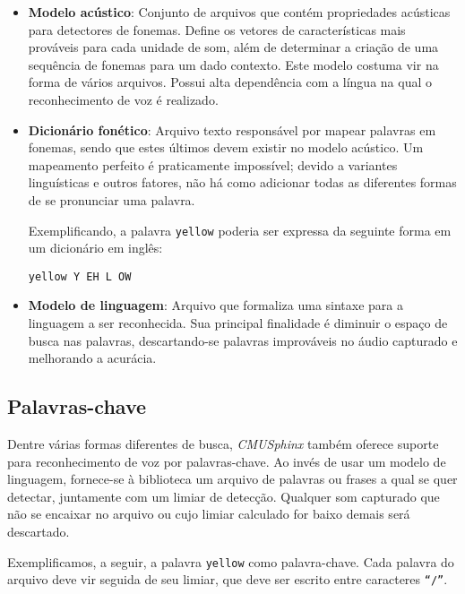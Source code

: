\begin{itemize}
\item \textbf{Modelo acústico}: Conjunto de arquivos que contém propriedades acústicas para detectores de fonemas. Define os vetores de características mais prováveis para cada unidade de som, além de determinar a criação de uma sequência de fonemas para um dado contexto. Este modelo costuma vir na forma de vários arquivos. Possui alta dependência com a língua na qual o reconhecimento de voz é realizado.

\item \textbf{Dicionário fonético}: Arquivo texto responsável por mapear palavras em fonemas, sendo que estes últimos devem existir no modelo acústico. Um mapeamento perfeito é praticamente impossível; devido a variantes linguísticas e outros fatores, não há como adicionar todas as diferentes formas de se pronunciar uma palavra.

Exemplificando, a palavra \texttt{yellow} poderia ser expressa da seguinte forma em um dicionário em inglês:

\begin{center}
\texttt{yellow Y EH L OW}
\end{center}

\item \textbf{Modelo de linguagem}: Arquivo que formaliza uma sintaxe para a linguagem a ser reconhecida. Sua principal finalidade é diminuir o espaço de busca nas palavras, descartando-se palavras improváveis no áudio capturado e melhorando a acurácia.
\end{itemize}


\subsection{Palavras-chave}
\label{pocketsphinx-keywords}

Dentre várias formas diferentes de busca, \textit{CMUSphinx} também oferece suporte para reconhecimento de voz por palavras-chave. Ao invés de usar um modelo de linguagem, fornece-se à biblioteca um arquivo de palavras ou frases a qual se quer detectar, juntamente com um limiar de detecção. Qualquer som capturado que não se encaixar no arquivo ou cujo limiar calculado for baixo demais será descartado.

Exemplificamos, a seguir, a palavra \texttt{yellow} como palavra-chave. Cada palavra do arquivo deve vir seguida de seu limiar, que deve ser escrito entre caracteres \texttt{``/''}.

